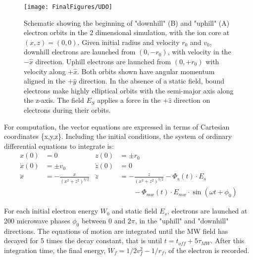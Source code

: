 \documentclass[aps,pra,preprint,groupedaddress]{revtex4-1}
\begin{document}
\begin{figure}
	\texttt{[image: FinalFigures/UDO]}
	\caption{Schematic showing the beginning of "downhill" (B) and "uphill" (A) electron orbits in the 2 dimensional simulation, with the ion core at $(x, z) = (0, 0)$. Given initial radius and velocity $r_0$ and $v_0$, downhill electrons are launched from $(0, -r_0)$, with velocity in the $-\hat{x}$ direction. Uphill electrons are launched from $(0, +r_0)$ with velocity along $+\hat{x}$. Both orbits shown have angular momentum aligned in the $+\hat{y}$ direction. In the absence of a static field, bound electrons make highly elliptical orbits with the semi-major axis along the z-axis. The field $E_S$ applies a force in the $+\hat{z}$ direction on electrons during their orbits.}
	\label{fig:udo}
\end{figure}

For computation, the vector equations are expressed in terms of Cartesian coordinates \{x,y,z\}. Including the initial conditions, the system of ordinary differential equations to integrate is:
\begin{align*}
x(0) & = 0 & z(0) & = \pm r_0 \\
\dot{x}(0) & = \pm v_0 & \dot{z}(0) & = 0 \\
\ddot{x} & = -\frac{x}{(x^2 + z^2)^{3/2}} & \ddot{z} & = -\frac{z}{(x^2 + z^2)^{3/2}} - \Phi_s(t) \cdot E_s \\
 & & & \quad \quad - \Phi_{mw}(t) \cdot E_{mw} \cdot \sin{(\omega t + \phi_0)}
\end{align*}

For each initial electron energy $W_0$ and static field $E_s$, electrons are launched at 200 microwave phases $\phi_0$ between 0 and $2\pi$, in the "uphill" and "downhill" directions. The equations of motion are integrated until the MW field has decayed for 5 times the decay constant, that is until  $t=t_{off} + 5\tau_{MW}$. After this integration time, the final energy, $W_f = 1/2 v_f^2 - 1/r_f$, of the electron is recorded.
\end{document}
